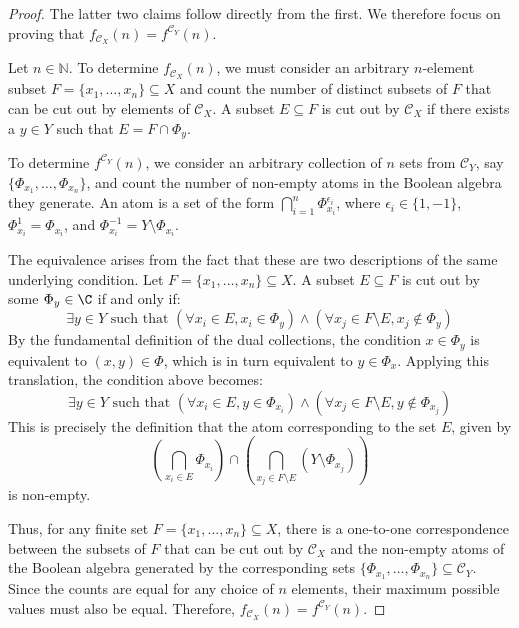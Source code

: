 \begin{proof}

    The latter two claims follow directly from the first. We therefore focus on proving that $f_{\mathcal{C}_X}(n) = f^{\mathcal{C}_Y}(n)$.

    Let $n \in \mathbb{N}$. To determine $f_{\mathcal{C}_X}(n)$, we must consider an arbitrary $n$-element subset $F = \{x_1, \dots, x_n\} \subseteq X$ and count the number of distinct subsets of $F$ that can be cut out by elements of $\mathcal{C}_X$. A subset $E \subseteq F$ is cut out by $\mathcal{C}_X$ if there exists a $y \in Y$ such that $E = F \cap \Phi_y$.

    To determine $f^{\mathcal{C}_Y}(n)$, we consider an arbitrary collection of $n$ sets from $\mathcal{C}_Y$, say $\{\Phi_{x_1}, \dots, \Phi_{x_n}\}$, and count the number of non-empty atoms in the Boolean algebra they generate. An atom is a set of the form $\bigcap_{i=1}^n \Phi_{x_i}^{\epsilon_i}$, where $\epsilon_i \in \{1, -1\}$, $\Phi_{x_i}^1 = \Phi_{x_i}$, and $\Phi_{x_i}^{-1} = Y \setminus \Phi_{x_i}$.

    The equivalence arises from the fact that these are two descriptions of the same underlying condition. Let $F = \{x_1, \dots, x_n\} \subseteq X$. A subset $E \subseteq F$ is cut out by some $\Phi_y \in \C$ if and only if:
    $$ \exists y \in Y \text{ such that } ( \forall x_i \in E, x_i \in \Phi_y ) \land ( \forall x_j \in F \setminus E, x_j \notin \Phi_y ) $$
    By the fundamental definition of the dual collections, the condition $x \in \Phi_y$ is equivalent to $(x,y) \in \Phi$, which is in turn equivalent to $y \in \Phi_x$. Applying this translation, the condition above becomes:
    $$ \exists y \in Y \text{ such that } ( \forall x_i \in E, y \in \Phi_{x_i} ) \land ( \forall x_j \in F \setminus E, y \notin \Phi_{x_j} ) $$
    This is precisely the definition that the atom corresponding to the set $E$, given by
    $$ \left( \bigcap_{x_i \in E} \Phi_{x_i} \right) \cap \left( \bigcap_{x_j \in F\setminus E} (Y \setminus \Phi_{x_j}) \right) $$
    is non-empty.

    Thus, for any finite set $F = \{x_1, \dots, x_n\} \subseteq X$, there is a one-to-one correspondence between the subsets of $F$ that can be cut out by $\mathcal{C}_X$ and the non-empty atoms of the Boolean algebra generated by the corresponding sets $\{\Phi_{x_1}, \dots, \Phi_{x_n}\} \subseteq \mathcal{C}_Y$. Since the counts are equal for any choice of $n$ elements, their maximum possible values must also be equal. Therefore, $f_{\mathcal{C}_X}(n) = f^{\mathcal{C}_Y}(n)$.
\end{proof}

